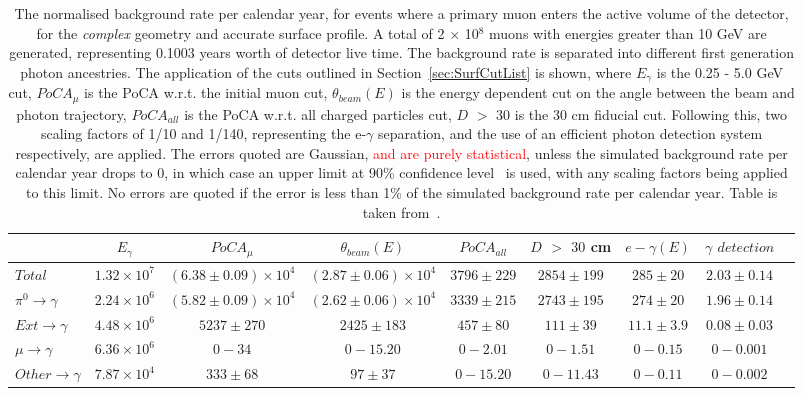 \begin{table}
  \caption[The normalised background rate per calendar year, for events where a primary muon enters the active volume of the detector, for the \emph{complex} geometry and accurate surface profile]
          {The normalised background rate per calendar year, for events where a primary muon enters the active volume of the detector, for the \emph{complex} geometry and accurate surface profile. A total of 2 $\times$ 10$^8$ muons with energies greater than 10 GeV are generated, representing 0.1003 years worth of detector live time. The background rate is separated into different first generation photon ancestries. The application of the cuts outlined in Section~\ref{sec:SurfCutList} is shown, where $E_\gamma$ is the 0.25 - 5.0 GeV cut, $PoCA_\mu$ is the PoCA w.r.t. the initial muon cut, $\theta_{beam}(E)$ is the energy dependent cut on the angle between the beam and photon trajectory, $PoCA_{all}$ is the PoCA w.r.t. all charged particles cut, $D$ $>$ $30$ is the 30 cm fiducial cut. Following this, two scaling factors of 1/10 and 1/140, representing the e-$\gamma$ separation, and the use of an efficient photon detection system respectively, are applied. The errors quoted are Gaussian, \textcolor{red}{and are purely statistical}, unless the simulated background rate per calendar year drops to 0, in which case an upper limit at 90\% confidence level~\citep{PhysRevD.57.3873} is used, with any scaling factors being applied to this limit. No errors are quoted if the error is less than 1\% of the simulated background rate per calendar year. Table is taken from~\citep{MartinsThesis}.}
  \label{tab:SurfMuComp}
  \centering
  \scriptsize
  \begin{tabular}{l c c c c c c c c }
    \toprule
        & $E_\gamma$ & $PoCA_\mu$ & $\theta_{beam}(E)$ & $PoCA_{all}$ & $D$ $>$ $30$ cm & $e-\gamma(E)$ & $\gamma$ $detection$ \\
        \midrule
        $Total$          & $1.32\times10^7$ & $(6.38\pm0.09)\times10^4$ & $(2.87\pm0.06)\times10^4$ & $3796\pm229$ & $2854\pm199$ & $285\pm20$   & $2.03\pm0.14$ \\

        $\pi^0\to\gamma$ & $2.24\times10^6$ & $(5.82\pm0.09)\times10^4$ & $(2.62\pm0.06)\times10^4$ & $3339\pm215$ & $2743\pm195$ & $274\pm20$   & $1.96\pm0.14$ \\

        $Ext\to\gamma$   & $4.48\times10^6$ & $5237\pm270$              & $2425\pm183$              & $457\pm80$   & $111\pm39$   & $11.1\pm3.9$ & $0.08\pm0.03$ \\

        $\mu\to\gamma$   & $6.36\times10^6$ & $0-34$                    & $0-15.20$                 & $0-2.01$     & $0-1.51$     & $0-0.15$     & $0-0.001$ \\

        $Other\to\gamma$ & $7.87\times10^4$ & $333\pm68$                & $97\pm37$                 & $0-15.20$    & $0-11.43$    & $0-0.11$     & $0-0.002$ \\
        \bottomrule
  \end{tabular}
\end{table}

